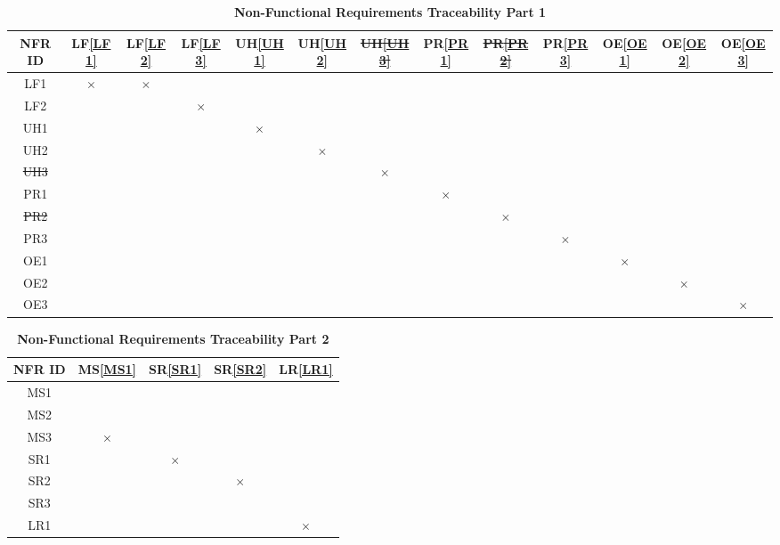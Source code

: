 \documentclass[12pt, titlepage]{article}
\begin{document}
\begin{table}[H]
\centering
\begin{tabular}{|c|c|c|c|c|c|c|c|c|c|c|c|c|}
\hline
 NFR ID & LF\ref{LF1} & LF\ref{LF2} & LF\ref{LF3} & UH\ref{UH1} & UH\ref{UH2} & \color{red}\sout{UH\ref{UH3}} & PR\ref{PR1} & \color{red}\sout{PR\ref{PR2}} & PR\ref{PR3} & OE\ref{OE1} & OE\ref{OE2} & OE\ref{OE3} \\
\hline
LF1 & $\times$ & $\times$ & & & & & & & & & &\\
\hline
LF2 &  &  & $\times$ & & & & & & & & &\\
\hline
UH1&  & & &$\times$ &  & & & & & & &\\
\hline
UH2 & & & & & $\times$& & & & & & &\\
\hline
\color{red}\sout{UH3} & & & & & &\color{red}\sout{$\times$} & & & & & & \\
\hline
PR1 &  & & & & & & $\times$ & & & & &\\
\hline
\color{red}\sout{PR2} &  & & & & & & & \color{red}\sout{$\times$} & & & &\\
\hline
PR3 &  & & & & & & & & $\times$ & & &\\
\hline
OE1 &  & & & & & & & & & $\times$& &\\
\hline
OE2 &  & & & & & & & & & & $\times$ & \\
\hline
OE3 &  & & & & & & & & & & & $\times$ \\
\hline
\end{tabular}
\caption{\bf Non-Functional Requirements Traceability Part 1}
\end{table}

\begin{table}[H]
\centering
\begin{tabular}{|c|c|c|c|c|}
\hline
NFR ID & MS\ref{MS1} & SR\ref{SR1} & SR\ref{SR2} & LR\ref{LR1} \\
\hline 
MS1 & & & & \\
\hline
MS2 & & & & \\
\hline
MS3 & $\times$ & & & \\
\hline
SR1 & & $\times$& & \\
\hline
SR2 & & & $\times$&  \\
\hline
SR3 & & & & \\
\hline
LR1 & & & & $\times$ \\
\hline
\end{tabular}
\caption{\bf Non-Functional Requirements Traceability Part 2}
\end{table}
\end{document}
